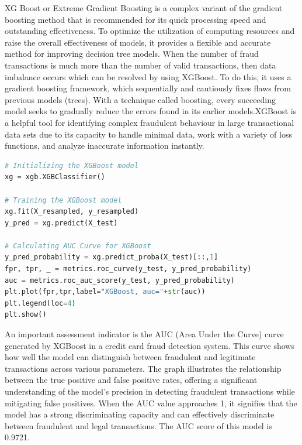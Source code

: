  XG Boost or Extreme Gradient Boosting is a complex variant of the gradient boosting method that is recommended for its quick processing speed and outstanding effectiveness. To optimize the utilization of computing resources and raise the overall effectiveness of models, it provides a flexible and accurate method for improving decision tree models. When the number of fraud transactions is much more than the number of valid transactions, then data imbalance occurs which can be resolved by using XGBoost. To do this, it uses a gradient boosting framework, which sequentially and cautiously fixes flaws from previous models (trees). With a technique called boosting, every succeeding model seeks to gradually reduce the errors found in its earlier models.XGBoost is a helpful tool for identifying complex fraudulent behaviour in large transactional data sets due to its capacity to handle minimal data, work with a variety of loss functions, and analyze inaccurate information instantly. 
\clearpage

 \begin{lstlisting}[language=Python, caption={Training the XGBoost model and AUC Curve for XGBoost}, label=list:python_code_ex]
# Initializing the XGBoost model
xg = xgb.XGBClassifier()

# Training the XGBoost model
xg.fit(X_resampled, y_resampled)
y_pred = xg.predict(X_test)

# Calculating AUC Curve for XGBoost
y_pred_probability = xg.predict_proba(X_test)[::,1]
fpr, tpr, _ = metrics.roc_curve(y_test, y_pred_probability)
auc = metrics.roc_auc_score(y_test, y_pred_probability)
plt.plot(fpr,tpr,label="XGBoost, auc="+str(auc))
plt.legend(loc=4)
plt.show()
\end{lstlisting}


 An important assessment indicator is the AUC (Area Under the Curve) curve generated by XGBoost in a credit card fraud detection system. This curve shows how well the model can distinguish between fraudulent and legitimate transactions across various parameters. The graph illustrates the relationship between the true positive and false positive rates, offering a significant understanding of the model's precision in detecting fraudulent transactions while mitigating false positives. When the AUC value approaches 1, it signifies that the model has a strong discriminating capacity and can effectively discriminate between fraudulent and legal transactions. The AUC score of this model is 0.9721. 

 

